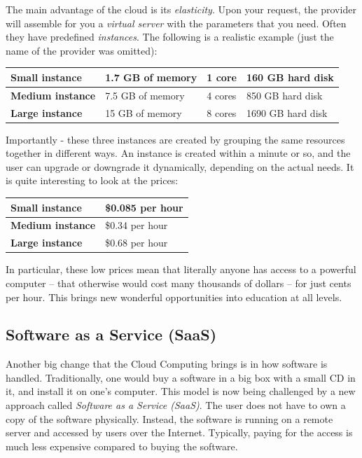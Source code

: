 \documentclass[article,A4,12pt]{llncs}
\begin{document}
The main advantage of the cloud is its {\em elasticity}. Upon your request, the
provider will assemble for you a {\em virtual server} with the parameters that 
you need. Often they have predefined {\em instances}. The following is a realistic 
example (just the name of the provider was omitted):\\

\begin{center}
\begin{tabular}{|l|l|l|l|}
\hline
{\bf Small instance} & 1.7 GB of memory & 1 core & 160 GB hard disk \\
\hline
{\bf Medium instance} & 7.5 GB of memory & 4 cores & 850 GB hard disk \\
\hline
{\bf Large instance} & 15 GB of memory & 8 cores & 1690 GB hard disk \\
\hline
\end{tabular}
\end{center}

\vspace{4mm}
\noindent
Importantly - these three instances are created by grouping the same resources together 
in different ways. An instance is created within a minute or so,
and the user can upgrade or downgrade it dynamically, depending on the actual needs.
It is quite interesting to look at the prices:

\begin{center}
\begin{tabular}{|l|l|}
\hline
{\bf Small instance} &	\$0.085 per hour\\
\hline
{\bf Medium instance}&	\$0.34 per hour	\\
\hline
{\bf Large instance}&	\$0.68 per hour\\
\hline
\end{tabular}
\end{center}

\vspace{4mm}
\noindent
In particular, these low prices mean that literally anyone has access to 
a powerful computer -- that otherwise would cost many thousands of dollars -- 
for just cents per hour. This brings new wonderful opportunities into 
education at all levels.

\subsection{Software as a Service (SaaS)}

Another big change that the Cloud Computing brings is in how software is handled. 
Traditionally, one would buy a software in a big box with a small CD in it, 
and install it on one's computer. This model is now being challenged by a new 
approach called {\em Software as a Service (SaaS)}. The user does not have 
to own a copy of the software physically. Instead, the software is running 
on a remote server and accessed by users over the Internet. Typically, paying 
for the access is much less expensive compared to buying the software.
\end{document}
